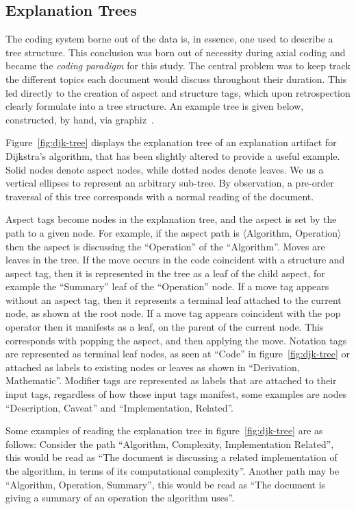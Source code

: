 \documentclass[sigconf]{acmart}
\newcommand{\brackets}[1]{$\langle$\ignorespaces#1\unskip$\rangle$}
\begin{document}
\subsection{Explanation Trees}
\label{sec:res:xopTree}
The coding system borne out of the data is, in essence, one used to describe a
tree structure. This conclusion was born out of necessity during axial coding
and became the \emph{coding paradigm} for this study. The central problem was to
keep track the different topics each document would discuss throughout their
duration. This led directly to the creation of aspect and structure tags, which
upon retrospection clearly formulate into a tree structure. An
example tree is given below, constructed, by hand, via
graphiz~\cite{Ellson2002}.



Figure~\ref{fig:djk-tree} displays the explanation tree of an explanation
artifact for Dijkstra's algorithm, that has been slightly altered to provide a
useful example. Solid nodes denote aspect nodes, while dotted nodes denote
leaves. We us a vertical ellipses to represent an arbitrary sub-tree. By
observation, a pre-order traversal of this tree corresponds with a normal
reading of the document.

Aspect tags become nodes in the explanation tree, and the aspect is set by the
path to a given node. For example, if the aspect path is \brackets{Algorithm,
  Operation} then the aspect is discussing the ``Operation'' of the
``Algorithm''. Moves are leaves in the tree. If the move occurs in the code
coincident with a structure and aspect tag, then it is represented in the tree
as a leaf of the child aspect, for example the ``Summary'' leaf of the
``Operation'' node. If a move tag appears without an aspect tag, then it
represents a terminal leaf attached to the current node, as shown at the root
node. If a move tag appears coincident with the pop operator then it manifests
as a leaf, on the parent of the current node. This corresponds with popping the
aspect, and then applying the move. Notation tags are represented as terminal
leaf nodes, as seen at ``Code'' in figure~\ref{fig:djk-tree} or attached as
labels to existing nodes or leaves as shown in ``Derivation, Mathematic''.
Modifier tags are represented as labels that are attached to their input tags,
regardless of how those input tags manifest, some examples are nodes
``Description, Caveat'' and ``Implementation, Related''.

Some examples of reading the explanation tree in figure~\ref{fig:djk-tree} are
as follows: Consider the path ``Algorithm, Complexity, Implementation Related'',
this would be read as ``The document is discussing a related implementation of
the algorithm, in terms of its computational complexity''. Another path may be
``Algorithm, Operation, Summary'', this would be read as ``The document is
giving a summary of an operation the algorithm uses''.
\end{document}
